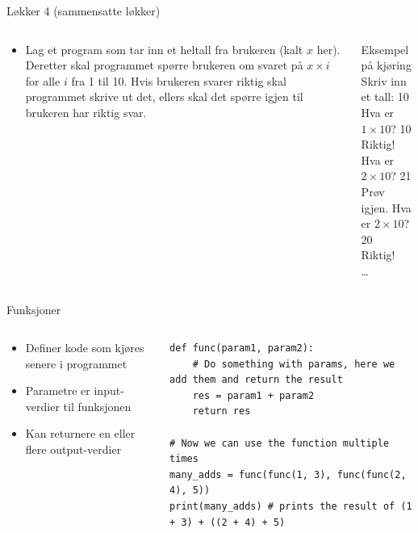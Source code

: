 \documentclass[screen, aspectratio=169]{beamer}
\begin{document}
\begin{frame}{Løkker 4 (sammensatte løkker)}
	\begin{columns}
		\begin{column}{.6\textwidth}
			\begin{itemize}
				\item Lag et program som tar inn et heltall fra brukeren (kalt $x$ her). Deretter skal programmet spørre brukeren om svaret på $x\times i$ for alle $i$ fra 1 til 10. Hvis brukeren svarer riktig skal programmet skrive ut det, ellers skal det spørre igjen til brukeren har riktig svar.
			\end{itemize}
		\end{column}
		\begin{column}{.4\textwidth}
			\begin{exampleblock}{Eksempel på kjøring}
				Skriv inn et tall: \textcolor{input-color}{10}\\
				Hva er $1\times 10$? \textcolor{input-color}{10}\\
				Riktig!\\
				Hva er $2\times 10$? \textcolor{input-color}{21}\\
				Prøv igjen. Hva er $2\times 10$? \textcolor{input-color}{20}\\
				Riktig!\\
				\ldots
			\end{exampleblock}
		\end{column}
	\end{columns}
\end{frame}

\begin{frame}[fragile]{Funksjoner}
	\begin{columns}
		\begin{column}{.4\textwidth}
			\begin{itemize}
				\item Definer kode som kjøres senere i programmet
				\item Parametre er input-verdier til funksjonen
				\item Kan returnere en eller flere output-verdier
			\end{itemize}
		\end{column}
		\begin{column}{.6\textwidth}
			\begin{lstlisting}
def func(param1, param2):
	# Do something with params, here we add them and return the result
	res = param1 + param2
	return res

# Now we can use the function multiple times
many_adds = func(func(1, 3), func(func(2, 4), 5))
print(many_adds) # prints the result of (1 + 3) + ((2 + 4) + 5)
			\end{lstlisting}
		\end{column}
	\end{columns}
\end{frame}
\end{document}
